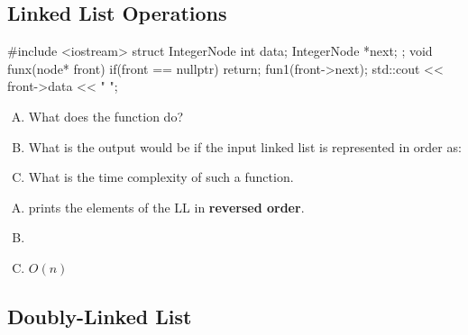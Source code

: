 \documentclass[usenames,dvipsnames]{article}
\begin{document}
\subsection{Linked List Operations}




\cprotEnv \begin{question}
\begin{cppcode}
#include <iostream>
struct IntegerNode
{
  int data;
  IntegerNode *next;
};
void funx(node* front)
{
  if(front == nullptr) return;
  fun1(front->next);
  std::cout << front->data << " ";
}
\end{cppcode}

\begin{enumerate}[A)]
\item What does the function  do?
\item What is the output would be if the input linked list is represented in order as: 
\item What is the time complexity of such a function.
\end{enumerate}
\end{question}

\begin{solution}

\begin{enumerate}[A)]
\item prints the elements of the LL in \textbf{reversed order}.
\item {}
\item $O(n)$
\end{enumerate}

\end{solution}



\subsection{Doubly-Linked List}
\end{document}
